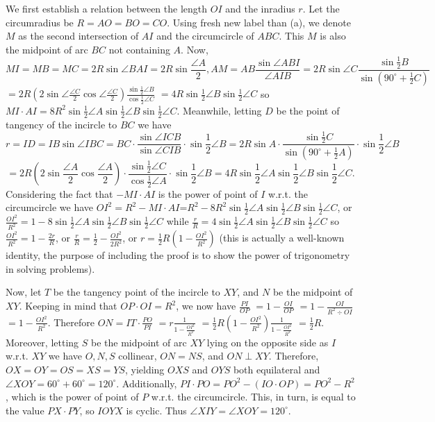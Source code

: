 \documentclass[11pt,a4paper]{article}
\begin{document}
\begin{itemize}
We first establish a relation between the length $OI$ and the inradius $r$. 
Let the circumradius be $R=AO=BO=CO$. Using fresh new label than (a), we denote $M$ as the second intersection of $AI$ and the circumcircle of $ABC$. 
This $M$ is also the midpoint of arc $BC$ not containing $A$. 
Now, \[MI=MB=MC=2R\sin \angle BAI=2R\sin\frac{\angle A}{2}, 
AM=AB\frac{\sin\angle ABI}{\angle AIB}
=2R\sin\angle C \frac{\sin\frac 12 B}{\sin (90^{\circ}+\frac 12 C)}\]
$=2R(2\sin\angle \frac{\angle C}{2} \cos\angle \frac{\angle C}{2}) \frac{\sin\frac 12 \angle B}{\cos\frac 12 \angle C}$
$=4R\sin\frac 12\angle B\sin\frac 12\angle C$
so $MI\cdot AI=8R^2\sin\frac 12 \angle A\sin\frac 12\angle B\sin\frac 12\angle C$. 
Meanwhile, letting $D$ be the point of tangency of the incircle to $BC$ we have 
\[r=ID=IB\sin\angle IBC=BC\cdot\frac{\sin\angle ICB}{\sin\angle CIB}\cdot\sin\frac 12\angle B
=2R\sin A\cdot\frac{\sin\frac 12 C}{\sin (90^{\circ}+\frac 12 A)}\cdot\sin\frac 12\angle B\]
\[=2R\left(2\sin\frac{\angle A}{2} \cos\frac{\angle A}{2}\right)\cdot\frac{\sin\frac 12\angle C}{\cos\frac 12\angle A}\cdot\sin\frac 12\angle B
=4R\sin\frac 12 \angle A\sin\frac 12\angle B\sin\frac 12\angle C.\]
Considering the fact that $-MI\cdot AI$ is the power of point of $I$ w.r.t. the circumcircle we have 
$OI^2=R^2-MI\cdot AI$=$R^2-8R^2\sin\frac 12 \angle A\sin\frac 12\angle B\sin\frac 12\angle C$, 
or $\frac{OI^2}{R^2}=1-8\sin\frac 12 \angle A\sin\frac 12\angle B\sin\frac 12\angle C$ 
while $\frac {r}{R}=4\sin\frac 12 \angle A\sin\frac 12\angle B\sin\frac 12\angle C$ 
so $\frac{OI^2}{R^2}=1-\frac {2r}{R}$, 
or $\frac{r}{R}=\frac 12-\frac{OI^2}{2R^2}$, 
or $r=\frac 12R\left(1-\frac{OI^2}{R^2}\right)$ 
(this is actually a well-known identity, the purpose of including the proof is to show the power of trigonometry in solving problems). 

Now, let $T$ be the tangency point of the incircle to $XY$, and $N$ be the midpoint of $XY$. 
Keeping in mind that $OP\cdot OI=R^2$, 
we now have $\frac{PI}{OP}$
$=1-\frac{OI}{OP}$
$=1-\frac{OI}{R^2\div OI}$
$=1-\frac{OI^2}{R^2}$. 
Therefore $ON=IT\cdot\frac{PO}{PI}$
$=r\frac{1}{1-\frac{OI^2}{R^2}}$
$=\frac 12 R(1-\frac{OI^2}{R^2})\frac{1}{1-\frac{OI^2}{R^2}}$
$=\frac 12 R$. 
Moreover, letting $S$ be the midpoint of arc $XY$ lying on the opposite side as $I$ w.r.t. $XY$ we have 
$O, N, S$ collinear, $ON=NS$, and $ON\perp XY$. 
Therefore, $OX=OY=OS=XS=YS$, 
yielding $OXS$ and $OYS$ both equilateral and 
$\angle XOY=60^{\circ}+60^{\circ}=120^{\circ}$. 
Additionally, $PI\cdot PO=PO^2-(IO\cdot OP)=PO^2-R^2$, 
which is the power of point of $P$ w.r.t. the circumcircle. 
This, in turn, is equal to the value $PX\cdot PY$, so $IOYX$ is cyclic. 
Thus $\angle XIY=\angle XOY=120^{\circ}$. 

\end{itemize}
\end{document}
